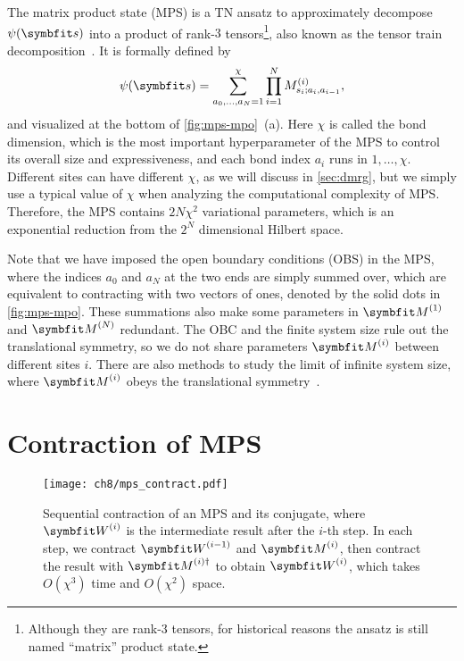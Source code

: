 The matrix product state (MPS) is a TN ansatz to approximately decompose $\psi(\vs)$ into a product of rank-$3$ tensors\footnote{Although they are rank-$3$ tensors, for historical reasons the ansatz is still named ``matrix'' product state.}, also known as the tensor train decomposition~\cite{oseledets2011tensor}. It is formally defined by
\begin{equation}
\psi(\vs) = \sum_{a_0, \ldots, a_N = 1}^\chi \prod_{i = 1}^N M^{(i)}_{s_i; a_i, a_{i - 1}},
\label{eq:mps}
\end{equation}
and visualized at the bottom of \cref{fig:mps-mpo}~(a). Here $\chi$ is called the bond dimension, which is the most important hyperparameter of the MPS to control its overall size and expressiveness, and each bond index $a_i$ runs in $1, \ldots, \chi$. Different sites can have different $\chi$, as we will discuss in \cref{sec:dmrg}, but we simply use a typical value of $\chi$ when analyzing the computational complexity of MPS. Therefore, the MPS contains $2 N \chi^2$ variational parameters, which is an exponential reduction from the $2^N$ dimensional Hilbert space.

Note that we have imposed the open boundary conditions (OBS) in the MPS, where the indices $a_0$ and $a_N$ at the two ends are simply summed over, which are equivalent to contracting with two vectors of ones, denoted by the solid dots in \cref{fig:mps-mpo}. These summations also make some parameters in $\mM^{(1)}$ and $\mM^{(N)}$ redundant. The OBC and the finite system size rule out the translational symmetry, so we do not share parameters $\mM^{(i)}$ between different sites $i$. There are also methods to study the limit of infinite system size, where $\mM^{(i)}$ obeys the translational symmetry~\cite{mcculloch2008infinite}.

\section{Contraction of MPS}
\label{sec:mps-contract}

\begin{figure}[htb]
\centering
\texttt{[image: ch8/mps\_contract.pdf]} \hspace{2cm}
\caption[Sequential contraction of MPS]{
Sequential contraction of an MPS and its conjugate, where $\mW^{(i)}$ is the intermediate result after the $i$-th step. In each step, we contract $\mW^{(i - 1)}$ and $\mM^{(i)}$, then contract the result with $\mM^{(i) \dagger}$ to obtain $\mW^{(i)}$, which takes $O(\chi^3)$ time and $O(\chi^2)$ space.
}
\label{fig:mps-contract}
\end{figure}

